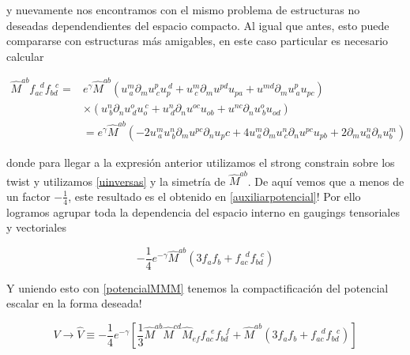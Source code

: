 \documentclass{article}
\numberwithin{equation}{section}
\begin{document}
y nuevamente nos encontramos con el mismo problema de estructuras no deseadas dependendientes del espacio compacto. Al igual que antes, esto puede compararse con estructuras más amigables, en este caso particular es necesario calcular

\begin{equation}
\begin{aligned}
\hat{M}^{a b} f_{a c}^{\ \ \ d} f_{b d}^{\ \ \ c} =& e^{\gamma} \hat{M}^{a b} \left( u^{m}_{ \ a} \partial_m u^{p}_{\ c} u_{ p}^{\ d} + u^{m}_{ \ c} \partial_m u^{p d} u_{ p a} + u^{m d} \partial_m u^{p}_{\ a} u_{ p c} \right)\\
&\times \left( u^{n}_{ \ b} \partial_n u^{o}_{\ d} u_{ o}^{\ c} + u^{n}_{ \ d} \partial_n u^{o c} u_{ o b} + u^{n c} \partial_n u^{o}_{\ b} u_{ o d} \right)\\
&=  e^{\gamma} \hat{M}^{a b} \left( -2 u^{m}_{ \ a} u^{n}_{ \ b} \partial_m u^{p c} \partial_n u_p c + 4 u^{m}_{ \ a} \partial_m u^{n}_{ \ c} \partial_n u^{p c} u_{p b} + 2 \partial_m u^{n}_a \partial_n u^m_b \right)
\end{aligned}
\end{equation}

donde para llegar a la expresión anterior utilizamos el strong constrain sobre los twist y utilizamos \ref{uinversas} y la simetría de $ \hat{M}^{a b} $. De aquí vemos que a menos de un factor $ -\frac{1}{4} $, este resultado es el obtenido en \ref{auxiliarpotencial}! Por ello logramos agrupar toda la dependencia del espacio interno en gaugings tensoriales y vectoriales

\begin{equation}
-\frac{1}{4} e^{-\gamma} \hat{M}^{a b} \left( 3 f_a f_b + f_{a c}^{\ \ \ d} f_{b d}^{\ \ \ c} \right) 
\end{equation}

Y uniendo esto con \ref{potencialMMM} tenemos la compactificación del potencial escalar en la forma deseada!\\

\begin{boxeq}
	\begin{equation}
	V \longrightarrow \hat{V} \equiv -\frac{1}{4} e^{- \gamma} \left[ \frac{1}{3} \hat{M}^{a b} \hat{M}^{c d}\hat{M}_{e f} f_{a c}^{\ \ \ e} f_{b d}^{\ \ \ f}  + \hat{M}^{a b} \left( 3 f_a f_b + f_{a c}^{\ \ \ d} f_{b d}^{\ \ \ c} \right)  \right]
	\end{equation}
\end{boxeq}
\end{document}
